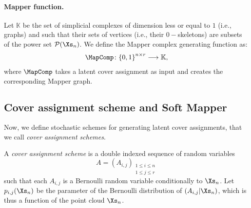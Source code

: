 

\paragraph*{Mapper function.} Let $\mathbb{K}$ be the set of simplicial complexes of dimension less or equal to $1$ (i.e., graphs) and such that their sets of vertices (i.e., their $0-$skeletons) are subsets of the power set $\mathcal{P}(\Xs_n)$. We define the Mapper complex generating function as:
$$
\MapComp \colon {\{0,1\}}^{n\times r}\longrightarrow \mathbb{K}, 
$$
where $\MapComp$ takes a latent cover assignment as input and creates the corresponding Mapper graph. %

\subsection{Cover assignment scheme and Soft Mapper}
\label{sec:CovAssign}

Now, we define stochastic schemes for generating latent cover assignments, that we call {\em cover assignment schemes}.

 
\begin{definition}
\label{def:cas}
A \emph{cover assignment scheme} is a double indexed sequence of random variables 
$$A=(A_{i,j})_{\substack{1\leq i\leq n \\ 1\leq j\leq r}}$$ 
such that each
$A_{i,j}$ is a Bernoulli random variable conditionally to $\Xs_n$. Let $p_{i,j}(\Xs_n)$ be the parameter of the Bernoulli distribution of $(A_{i,j}|\Xs_n)$, which is thus a function of the point cloud $\Xs_n$.
\end{definition}

